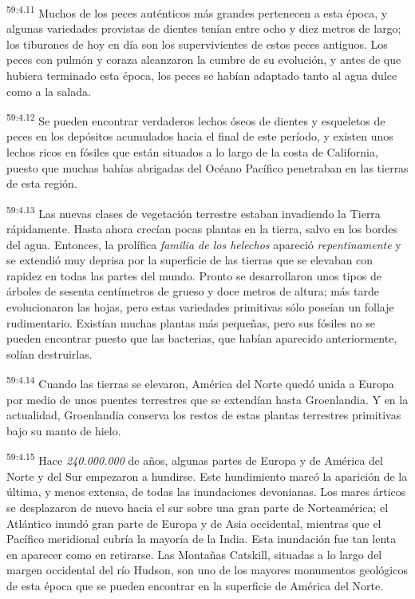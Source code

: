 \par
\textsuperscript{59:4.11} Muchos de los peces auténticos más grandes pertenecen a esta época, y algunas variedades provistas de dientes tenían entre ocho y diez metros de largo; los tiburones de hoy en día son los supervivientes de estos peces antiguos. Los peces con pulmón y coraza alcanzaron la cumbre de su evolución, y antes de que hubiera terminado esta época, los peces se habían adaptado tanto al agua dulce como a la salada.

\par
\textsuperscript{59:4.12} Se pueden encontrar verdaderos lechos óseos de dientes y esqueletos de peces en los depósitos acumulados hacia el final de este período, y existen unos lechos ricos en fósiles que están situados a lo largo de la costa de California, puesto que muchas bahías abrigadas del Océano Pacífico penetraban en las tierras de esta región.

\par
\textsuperscript{59:4.13} Las nuevas clases de vegetación terrestre estaban invadiendo la Tierra rápidamente. Hasta ahora crecían pocas plantas en la tierra, salvo en los bordes del agua. Entonces, la prolífica \textit{familia de los helechos} apareció \textit{repentinamente} y se extendió muy deprisa por la superficie de las tierras que se elevaban con rapidez en todas las partes del mundo. Pronto se desarrollaron unos tipos de árboles de sesenta centímetros de grueso y doce metros de altura; más tarde evolucionaron las hojas, pero estas variedades primitivas sólo poseían un follaje rudimentario. Existían muchas plantas más pequeñas, pero sus fósiles no se pueden encontrar puesto que las bacterias, que habían aparecido anteriormente, solían destruirlas.

\par
\textsuperscript{59:4.14} Cuando las tierras se elevaron, América del Norte quedó unida a Europa por medio de unos puentes terrestres que se extendían hasta Groenlandia. Y en la actualidad, Groenlandia conserva los restos de estas plantas terrestres primitivas bajo su manto de hielo.

\par
\textsuperscript{59:4.15} Hace \textit{240.000.000} de años, algunas partes de Europa y de América del Norte y del Sur empezaron a hundirse. Este hundimiento marcó la aparición de la última, y menos extensa, de todas las inundaciones devonianas. Los mares árticos se desplazaron de nuevo hacia el sur sobre una gran parte de Norteamérica; el Atlántico inundó gran parte de Europa y de Asia occidental, mientras que el Pacífico meridional cubría la mayoría de la India. Esta inundación fue tan lenta en aparecer como en retirarse. Las Montañas Catskill, situadas a lo largo del margen occidental del río Hudson, son uno de los mayores monumentos geológicos de esta época que se pueden encontrar en la superficie de América del Norte.

